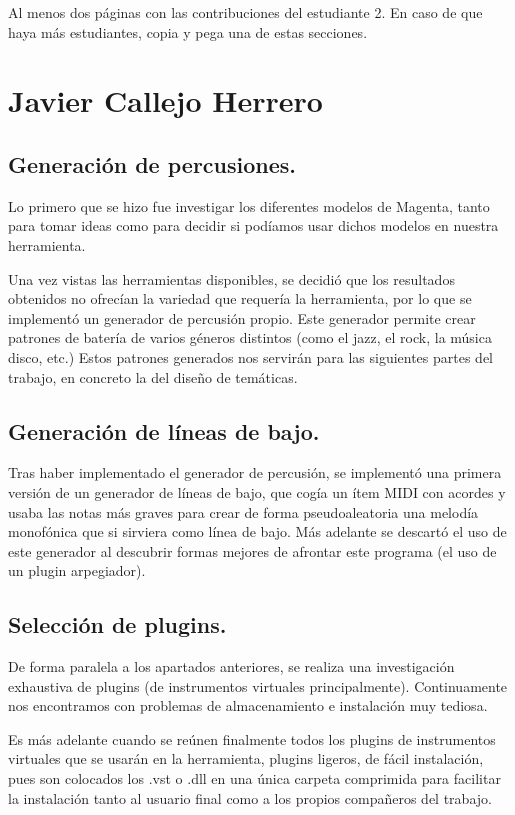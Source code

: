 Al menos dos páginas con las contribuciones del estudiante 2. En caso de que haya más estudiantes, copia y pega una de estas secciones.

\section*{Javier Callejo Herrero}
\subsection*{Generación de percusiones.}
Lo primero que se hizo fue investigar los diferentes modelos de Magenta, tanto para tomar ideas como para decidir si podíamos usar dichos modelos en nuestra herramienta. 

Una vez vistas las herramientas disponibles, se decidió que los resultados obtenidos no ofrecían la variedad que requería la herramienta, por lo que se implementó un generador de percusión propio. Este generador permite crear patrones de batería de varios géneros distintos (como el jazz, el rock, la música disco, etc.) Estos patrones generados nos servirán para las siguientes partes del trabajo, en concreto la del diseño de temáticas.

\subsection*{Generación de líneas de bajo.}
Tras haber implementado el generador de percusión, se implementó una primera versión de un generador de líneas de bajo, que cogía un ítem MIDI con acordes y usaba las notas más graves para crear de forma pseudoaleatoria una melodía monofónica que si  sirviera como línea de bajo. Más adelante se descartó el uso de este generador al descubrir formas mejores de afrontar este programa (el uso de un plugin arpegiador).

\subsection*{Selección de plugins.}
De forma paralela a los apartados anteriores, se realiza una investigación exhaustiva de plugins (de instrumentos virtuales principalmente). Continuamente nos encontramos con problemas de almacenamiento e instalación muy tediosa.

Es más adelante cuando se reúnen finalmente todos los plugins de instrumentos virtuales que se usarán en la herramienta, plugins ligeros, de fácil instalación, pues son colocados los .vst o .dll en una única carpeta comprimida para facilitar la instalación tanto al usuario final como a los propios compañeros del trabajo.

